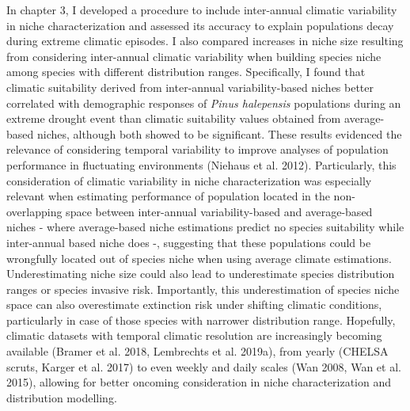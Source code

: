 \documentclass[11pt,twoside]{reedthesis}
\begin{document}
In chapter 3, I developed a procedure to include inter-annual climatic
variability in niche characterization and assessed its accuracy to
explain populations decay during extreme climatic episodes. I also
compared increases in niche size resulting from considering inter-annual
climatic variability when building species niche among species with
different distribution ranges. Specifically, I found that climatic
suitability derived from inter-annual variability-based niches better
correlated with demographic responses of \emph{Pinus halepensis}
populations during an extreme drought event than climatic suitability
values obtained from average-based niches, although both showed to be
significant. These results evidenced the relevance of considering
temporal variability to improve analyses of population performance in
fluctuating environments (Niehaus et al. 2012). Particularly, this
consideration of climatic variability in niche characterization was
especially relevant when estimating performance of population located in
the non-overlapping space between inter-annual variability-based and
average-based niches - where average-based niche estimations predict no
species suitability while inter-annual based niche does -, suggesting
that these populations could be wrongfully located out of species niche
when using average climate estimations. Underestimating niche size could
also lead to underestimate species distribution ranges or species
invasive risk. Importantly, this underestimation of species niche space
can also overestimate extinction risk under shifting climatic
conditions, particularly in case of those species with narrower
distribution range. Hopefully, climatic datasets with temporal climatic
resolution are increasingly becoming available (Bramer et al. 2018,
Lembrechts et al. 2019a), from yearly (CHELSA scruts, Karger et al.
2017) to even weekly and daily scales (Wan 2008, Wan et al. 2015),
allowing for better oncoming consideration in niche characterization and
distribution modelling.\par
\end{document}
